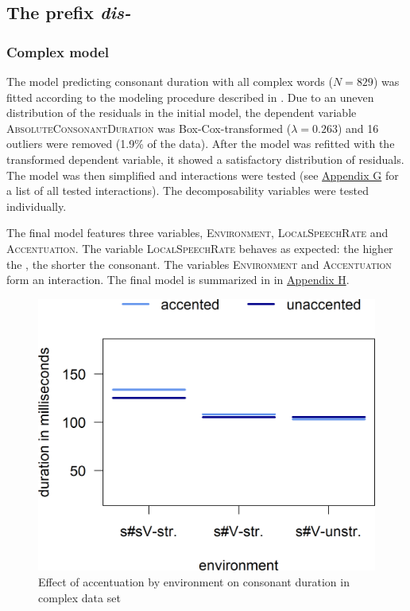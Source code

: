 \subsection{The prefix \textit{dis-} }


\subsubsection{Complex model}

The model predicting consonant duration with all complex words ($N=829$) was fitted according to the modeling procedure described in . Due to an uneven distribution of the residuals in the initial model, the dependent variable \textsc{AbsoluteConsonantDuration} was Box-Cox-transformed ($\lambda = 0.263$) and 16 outliers were removed (1.9\% of the data). After the model was refitted with the transformed dependent variable, it showed a satisfactory distribution of residuals. The model was then simplified and interactions were tested (see \hyperref[Appendix G Summaries of tested interactions in experimental study]{Appendix G} for a list of all tested interactions). The decomposability variables were tested individually.

The final model features three variables, \textsc{Environment}, \textsc{LocalSpeechRate} and \textsc{Accentuation}. The variable \textsc{LocalSpeechRate} behaves as expected: the higher the , the shorter the consonant. The variables \textsc{Environment} and \textsc{Accentuation} form an interaction. The final model is summarized in  in \hyperref[Appendix H: Model Summaries Experiment]{Appendix H}.

\begin{figure}[b]
\includegraphics [scale=0.5] {images/Experiment/DisModelInterEnvAcc}
\caption{Effect of accentuation by environment on consonant duration in complex data set}
\label{fig:NumNasal disComplex experiment}
\end{figure}\pagebreak

